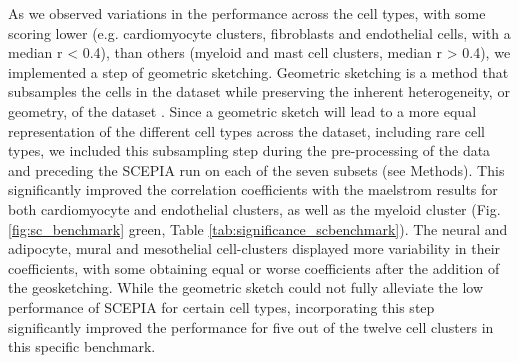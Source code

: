 As we observed variations in the performance across the cell types, with some scoring lower (e.g. cardiomyocyte clusters, fibroblasts and endothelial cells, with a median r < 0.4), than others (myeloid and mast cell clusters, median r > 0.4), we implemented a step of geometric sketching. Geometric sketching is a method that subsamples the cells in the dataset while preserving the inherent heterogeneity, or geometry, of the dataset \cite{Hie2019}. Since a geometric sketch will lead to a more equal representation of the different cell types across the dataset, including rare cell types, we included this subsampling step during the pre-processing of the data and preceding the SCEPIA run on each of the seven subsets (see Methods). This significantly improved the correlation coefficients with the maelstrom results for both cardiomyocyte and endothelial clusters, as well as the myeloid cluster (Fig. \ref{fig:sc_benchmark} green, Table \ref{tab:significance_scbenchmark}). The neural and adipocyte, mural and mesothelial cell-clusters displayed more variability in their coefficients, with some obtaining equal or worse coefficients after the addition of the geosketching. While the geometric sketch could not fully alleviate the low performance of SCEPIA for certain cell types, incorporating this step significantly improved the performance for five out of the twelve cell clusters in this specific benchmark. 

